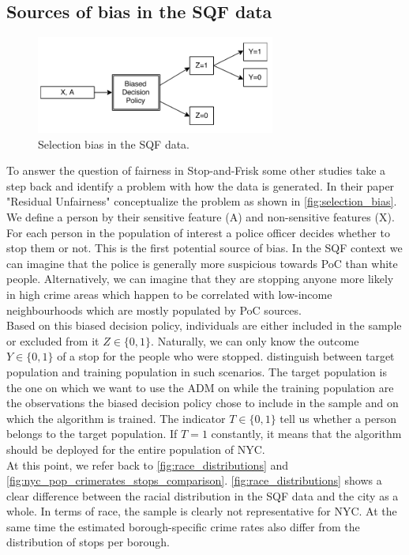 
\subsection*{Sources of bias in the SQF data}
\begin{figure}
    \includegraphics[width=0.7\textwidth]{../figures/selection_bias.png}
    \caption{Selection bias in the SQF data.}
    \label{fig:selection_bias}
\end{figure}
To answer the question of fairness in Stop-and-Frisk some other studies take a step back and identify a problem with how the data is generated. In their paper "Residual Unfairness" \cite{kallus2018} conceptualize the problem as shown in \autoref{fig:selection_bias}.
We define a person by their sensitive feature (A) and non-sensitive features (X). For each person in the population of interest a police officer decides whether to stop them or not. This is the first potential source of bias. In the SQF context we can imagine that the police is generally more suspicious towards PoC than white people. Alternatively, we can imagine that they are stopping anyone more likely in high crime areas which happen to be correlated with low-income neighbourhoods which are mostly populated by PoC {\color{red}sources}. \\
Based on this biased decision policy, individuals are either included in the sample or excluded from it $Z \in \{0,1\}$.  Naturally, we can only know the outcome $Y \in \{0, 1\}$ of a stop for the people who were stopped.
\cite{kallus2018} distinguish between target population and training population in such scenarios. The target population is the one on which we want to use the ADM on while the training population are the observations the biased decision policy chose to include in the sample and on which the algorithm is trained. The indicator $T \in \{0, 1\}$ tell us whether a person belongs to the target population. If $T = 1$ constantly, it means that the algorithm should be deployed for the entire population of NYC.\\
At this point, we refer back to \autoref{fig:race_distributions} and \autoref{fig:nyc_pop_crimerates_stops_comparison}. \autoref{fig:race_distributions} shows a clear difference between the racial distribution in the SQF data and the city as a whole. In terms of race, the sample is clearly not representative for NYC. At the same time the estimated borough-specific crime rates also differ from the distribution of stops per borough. \\

